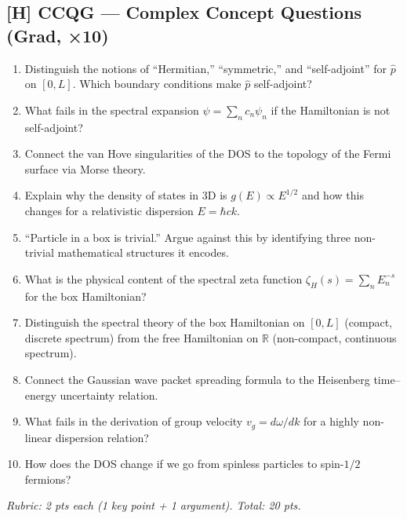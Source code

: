 \subsection*{[H] CCQG — Complex Concept Questions (Grad, ×10)}
\begin{tcolorbox}[gradconceptbox, title={CCQG · L01 · Tiers 4–5 · 35–50 min}]
\begin{enumerate}[label=\textbf{Q\arabic*.}]
  \item Distinguish the notions of ``Hermitian,'' ``symmetric,'' and ``self-adjoint'' for $\hat{p}$ on $[0,L]$. Which boundary conditions make $\hat{p}$ self-adjoint?
  \item What fails in the spectral expansion $\psi = \sum_n c_n\psi_n$ if the Hamiltonian is not self-adjoint?
  \item Connect the van Hove singularities of the DOS to the topology of the Fermi surface via Morse theory.
  \item Explain why the density of states in 3D is $g(E)\propto E^{1/2}$ and how this changes for a relativistic dispersion $E = \hbar ck$.
  \item ``Particle in a box is trivial.'' Argue against this by identifying three non-trivial mathematical structures it encodes.
  \item What is the physical content of the spectral zeta function $\zeta_H(s) = \sum_n E_n^{-s}$ for the box Hamiltonian?
  \item Distinguish the spectral theory of the box Hamiltonian on $[0,L]$ (compact, discrete spectrum) from the free Hamiltonian on $\mathbb{R}$ (non-compact, continuous spectrum).
  \item Connect the Gaussian wave packet spreading formula to the Heisenberg time–energy uncertainty relation.
  \item What fails in the derivation of group velocity $v_g = d\omega/dk$ for a highly non-linear dispersion relation?
  \item How does the DOS change if we go from spinless particles to spin-$1/2$ fermions?
\end{enumerate}
\textit{Rubric: 2 pts each (1 key point + 1 argument). Total: 20 pts.}
\end{tcolorbox}

